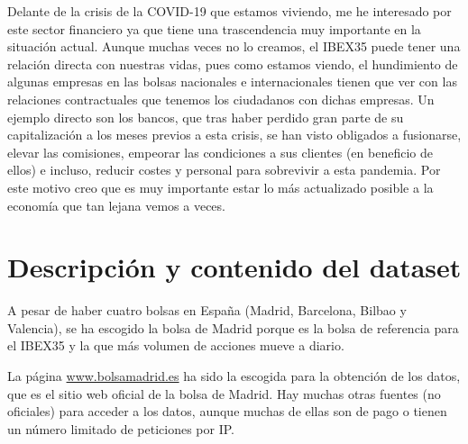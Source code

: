 \documentclass[12pt]{article}
\begin{document}
Delante de la crisis de la COVID-19 que estamos viviendo, me he interesado por este sector financiero ya que tiene una trascendencia muy importante en la situación actual. Aunque muchas veces no lo creamos, el IBEX35 puede tener una relación directa con nuestras vidas, pues como estamos viendo, el hundimiento de algunas empresas en las bolsas nacionales e internacionales tienen que ver con las relaciones contractuales que tenemos los ciudadanos con dichas empresas. Un ejemplo directo son los bancos, que tras haber perdido gran parte de su capitalización a los meses previos a esta crisis, se han visto obligados a fusionarse, elevar las comisiones, empeorar las condiciones a sus clientes (en beneficio de ellos) e incluso, reducir costes y personal para sobrevivir a esta pandemia. Por este motivo creo que es muy importante estar lo más actualizado posible a la economía que tan lejana vemos a veces.


\section*{Descripción y contenido del dataset}
A pesar de haber cuatro bolsas en España (Madrid, Barcelona, Bilbao y Valencia), se ha escogido la bolsa de Madrid porque es la bolsa de referencia para el IBEX35 y la que más volumen de acciones mueve a diario. 

La página \url{www.bolsamadrid.es} ha sido la escogida para la obtención de los datos, que es el sitio web oficial de la bolsa de Madrid. Hay muchas otras fuentes (no oficiales) para acceder a los datos, aunque muchas de ellas son de pago o tienen un número limitado de peticiones por IP. 
\end{document}
